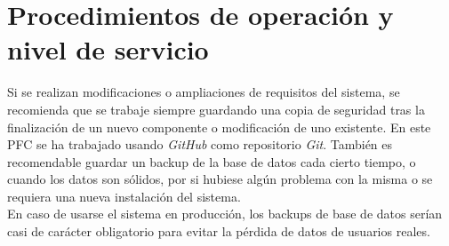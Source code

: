 \section{Procedimientos de operación y nivel de servicio}

Si se realizan modificaciones o ampliaciones de requisitos del sistema, se recomienda que se trabaje siempre guardando una copia de seguridad tras la finalización de un nuevo componente o modificación de uno existente. En este PFC se ha trabajado usando \textit{GitHub} como repositorio \textit{Git}. También es recomendable guardar un backup de la base de datos cada cierto tiempo, o cuando los datos son sólidos, por si hubiese algún problema con la misma o se requiera una nueva instalación del sistema. \\

En caso de usarse el sistema en producción, los backups de base de datos serían casi de carácter obligatorio para evitar la pérdida de datos de usuarios reales. 

